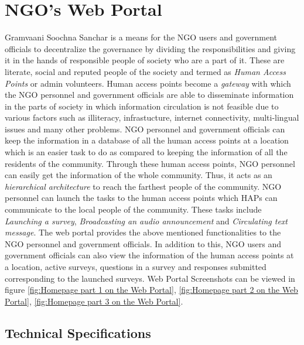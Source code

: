 
\chapter{NGO's Web Portal}
\label{chap:ngoportal}
Gramvaani Soochna Sanchar is a means for the NGO users and government officials to decentralize the governance by dividing the responsibilities and giving it in the hands of responsible people of society who are a part of it. These are literate, social and reputed people of the society and termed as \emph{Human Access Points} or admin volunteers. Human access points become a \emph{gateway}  with which the NGO personnel and government officials are able to disseminate information in the parts of society in which information circulation is not feasible due to various factors such as illiteracy, infrastucture, internet connectivity, multi-lingual issues and many other problems. NGO personnel and government officials can keep the information in a database of all the human access points at a location which is an easier task to do as compared to keeping the information of all the residents of the community. Through these human access points, NGO personnel can easily get the information of the whole community. Thus, it acts as an \emph{hierarchical architecture} to reach the farthest people of the community. NGO personnel can launch the tasks to the human access points which HAPs can communicate to the local people of the community. These tasks include \emph{Launching a survey}, \emph{Broadcasting an audio announcement} and  \emph{Circulating text message}. The web portal provides the above mentioned functionalities to the NGO personnel and government officials. In addition to this, NGO users and government officials can also view the information of the human access points at a location, active surveys, questions in a survey and responses submitted corresponding to the launched surveys. Web Portal Screenshots can be viewed in figure \ref{fig:Homepage part 1 on the Web Portal}, \ref{fig:Homepage part 2 on the Web Portal}, \ref{fig:Homepage part 3 on the Web Portal}.

\pagebreak
\section{Technical Specifications}


